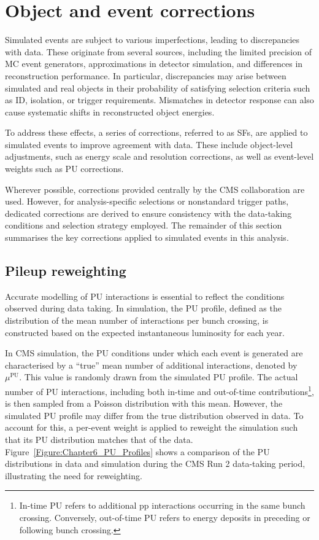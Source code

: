 \section{Object and event corrections}

Simulated events are subject to various imperfections, leading to discrepancies with data. These originate from several sources, including the limited precision of \ac{MC} event generators, approximations in detector simulation, and differences in reconstruction performance. In particular, discrepancies may arise between simulated and real objects in their probability of satisfying selection criteria such as ID, isolation, or trigger requirements. Mismatches in detector response can also cause systematic shifts in reconstructed object energies.

To address these effects, a series of corrections, referred to as \acp{SF}, are applied to simulated events to improve agreement with data. These include object-level adjustments, such as energy scale and resolution corrections, as well as event-level weights such as \ac{PU} corrections.

Wherever possible, corrections provided centrally by the \ac{CMS} collaboration are used. However, for analysis-specific selections or nonstandard trigger paths, dedicated corrections are derived to ensure consistency with the data-taking conditions and selection strategy employed. The remainder of this section summarises the key corrections applied to simulated events in this analysis.

\subsection{Pileup reweighting}

Accurate modelling of \ac{PU} interactions is essential to reflect the conditions observed during data taking. In simulation, the \ac{PU} profile, defined as the distribution of the mean number of interactions per bunch crossing, is constructed based on the expected instantaneous luminosity for each year. 

In \ac{CMS} simulation, the \ac{PU} conditions under which each event is generated are characterised by a ``true'' mean number of additional interactions, denoted by $\mu^{\text{PU}}$. This value is randomly drawn from the simulated \ac{PU} profile. The actual number of \ac{PU} interactions, including both in-time and out-of-time contributions\footnote{In-time \ac{PU} refers to additional pp interactions occurring in the same bunch crossing. Conversely, out-of-time \ac{PU} refers to energy deposits in preceding or following bunch crossing.}, is then sampled from a Poisson distribution with this mean. However, the simulated \ac{PU} profile may differ from the true distribution observed in data. To account for this, a per-event weight is applied to reweight the simulation such that its \ac{PU} distribution matches that of the data. Figure~\ref{Figure:Chapter6_PU_Profiles} shows a comparison of the \ac{PU} distributions in data and simulation during the \ac{CMS} Run 2 data-taking period, illustrating the need for reweighting.

